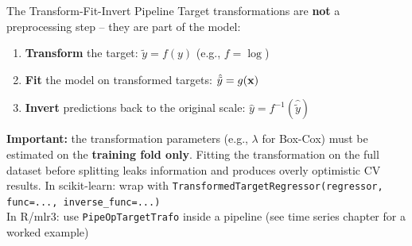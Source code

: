 \documentclass[11pt,compress,t,notes=noshow, xcolor=table]{beamer}
\begin{document}
\begin{vbframe}{The Transform-Fit-Invert Pipeline}
\vfill
Target transformations are \textbf{not} a preprocessing step -- they are part of the model:
\vfill
\begin{enumerate}\setlength{\itemsep}{4pt}
    \item \textbf{Transform} the target: $\tilde{y} = f(y)$ \quad (e.g., $f = \log$)
    \item \textbf{Fit} the model on transformed targets: $\hat{\tilde{y}} = g(\mathbf{x})$
    \item \textbf{Invert} predictions back to the original scale: $\hat{y} = f^{-1}(\hat{\tilde{y}})$
\end{enumerate}
\vfill
\textbf{Important:} the transformation parameters (e.g., $\lambda$ for Box-Cox) must be estimated on the \textbf{training fold only}. Fitting the transformation on the full dataset before splitting leaks information and produces overly optimistic CV results.
\vfill
\footnotesize
In scikit-learn: wrap with \texttt{TransformedTargetRegressor(regressor, func=..., inverse\_func=...)}\\
In R/mlr3: use \texttt{PipeOpTargetTrafo} inside a pipeline (see time series chapter for a worked example)
\vfill
\end{vbframe}
\end{document}
